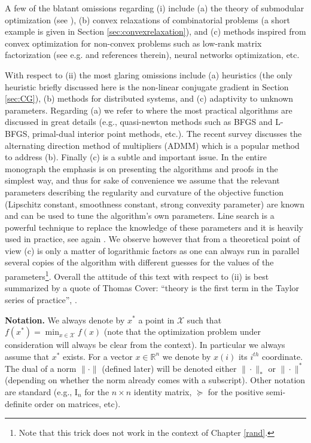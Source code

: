 \documentclass[openany]{now}
\newcommand{\mI}{\mathrm{I}}
\newcommand{\R}{\mathbb{R}}
\newcommand{\cX}{\mathcal{X}}
\begin{document}
A few of the blatant omissions regarding (i) include (a) the theory of submodular optimization (see \cite{Bac13}), (b) convex relaxations of combinatorial problems (a short example is given in Section \ref{sec:convexrelaxation}), and (c) methods inspired from convex optimization for non-convex problems such as low-rank matrix factorization (see e.g. \cite{JNS13} and references therein), neural networks optimization, etc. 

With respect to (ii) the most glaring omissions include (a) heuristics (the only heuristic briefly discussed here is the non-linear conjugate gradient in Section \ref{sec:CG}), (b) methods for distributed systems, and (c) adaptivity to unknown parameters. Regarding (a) we refer to \cite{NW06} where the most practical algorithms are discussed in great details (e.g., quasi-newton methods such as BFGS and L-BFGS, primal-dual interior point methods, etc.). The recent survey \cite{BPCPE11} discusses the alternating direction method of multipliers (ADMM) which is a popular method to address (b). Finally (c) is a subtle and important issue. In the entire monograph the emphasis is on presenting the algorithms and proofs in the simplest way, and thus for sake of convenience we assume that the relevant parameters describing the regularity and curvature of the objective function (Lipschitz constant, smoothness constant, strong convexity parameter) are known and can be used to tune the algorithm's own parameters. Line search is a powerful technique to replace the knowledge of these parameters and it is heavily used in practice, see again \cite{NW06}. We observe however that from a theoretical point of view (c) is only a matter of logarithmic factors as one can always run in parallel several copies of the algorithm with different guesses for the values of the parameters\footnote{Note that this trick does not work in the context of Chapter \ref{rand}.}. Overall the attitude of this text with respect to (ii) is best summarized by a quote of Thomas Cover: ``theory is the first term in the Taylor series of practice'', \cite{Cov92}.
\newline

\textbf{Notation.} We always denote by $x^*$ a point in $\cX$ such that $f(x^*) = \min_{x \in \cX} f(x)$ (note that the optimization problem under consideration will always be clear from the context). In particular we always assume that $x^*$ exists. For a vector $x \in \R^n$ we denote by $x(i)$ its $i^{th}$ coordinate. The dual of a norm $\|\cdot\|$ (defined later) will be denoted either $\|\cdot\|_*$ or $\|\cdot\|^*$ (depending on whether the norm already comes with a subscript). Other notation are standard (e.g., $\mI_n$ for the $n \times n$ identity matrix, $\succeq$ for the positive semi-definite order on matrices, etc).
\end{document}
